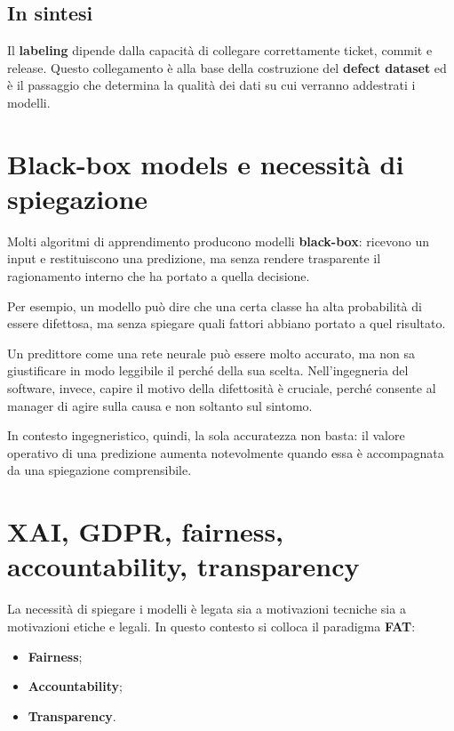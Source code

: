 \subsection*{In sintesi}
Il \textbf{labeling} dipende dalla capacità di collegare correttamente ticket, commit e release. Questo collegamento è alla base della costruzione del \textbf{defect dataset} ed è il passaggio che determina la qualità dei dati su cui verranno addestrati i modelli.

\section{Black-box models e necessità di spiegazione}

Molti algoritmi di apprendimento producono modelli \textbf{black-box}: ricevono un input e restituiscono una predizione, ma senza rendere trasparente il ragionamento interno che ha portato a quella decisione.

Per esempio, un modello può dire che una certa classe ha alta probabilità di essere difettosa, ma senza spiegare quali fattori abbiano portato a quel risultato.

\begin{notaprof}
Un predittore come una rete neurale può essere molto accurato, ma non sa giustificare in modo leggibile il perché della sua scelta. Nell'ingegneria del software, invece, capire il motivo della difettosità è cruciale, perché consente al manager di agire sulla causa e non soltanto sul sintomo.
\end{notaprof}

In contesto ingegneristico, quindi, la sola accuratezza non basta: il valore operativo di una predizione aumenta notevolmente quando essa è accompagnata da una spiegazione comprensibile.

\section{XAI, GDPR, fairness, accountability, transparency}

La necessità di spiegare i modelli è legata sia a motivazioni tecniche sia a motivazioni etiche e legali. In questo contesto si colloca il paradigma \textbf{FAT}:
\begin{itemize}
    \item \textbf{Fairness};
    \item \textbf{Accountability};
    \item \textbf{Transparency}.
\end{itemize}

